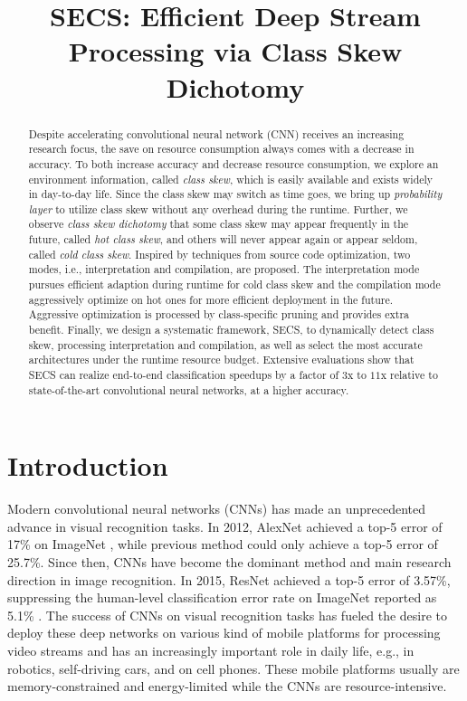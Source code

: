 \documentclass[pageno]{jpaper}
\begin{document}
\title{SECS: Efficient Deep Stream Processing via Class Skew Dichotomy}
\author{}
\date{}
\maketitle

\thispagestyle{empty}

\begin{abstract}
Despite accelerating convolutional neural network (CNN) receives an increasing research focus, the save on resource consumption always comes with a decrease in accuracy. To both increase accuracy and decrease resource consumption, we explore an environment information, called \textit{class skew}, which is easily available and exists widely in day-to-day life. Since the class skew may switch as time goes, we bring up \textit{probability layer} to utilize class skew without any overhead during the runtime. Further, we observe \textit{class skew dichotomy} that some class skew may appear frequently in the future, called \textit{hot class skew}, and others will never appear again or appear seldom, called \textit{cold class skew}. Inspired by techniques from source code optimization, two modes, i.e., interpretation and compilation, are proposed. The interpretation mode pursues efficient adaption during runtime for cold class skew and the compilation mode aggressively optimize on hot ones for more efficient deployment in the future. Aggressive optimization is processed by class-specific pruning and provides extra benefit. Finally, we design a systematic framework, SECS, to dynamically detect class skew, processing interpretation and compilation, as well as select the most accurate architectures under the runtime resource budget. Extensive evaluations show that SECS can realize end-to-end classification speedups by a factor of $3$x to $11$x relative to state-of-the-art convolutional neural networks, at a higher accuracy.
\end{abstract}




\section{Introduction} \label{Introduction}

Modern convolutional neural networks (CNNs) has made an unprecedented advance in visual recognition tasks. In 2012, AlexNet \cite{krizhevsky2012imagenet} achieved a top-5 error of 17\% on ImageNet \cite{deng2009imagenet}, while previous method could only achieve a top-5 error of 25.7\%. Since then, CNNs have become the dominant method and main research direction in image recognition. In 2015, ResNet \cite{he2016deep} achieved a top-5 error of 3.57\%, suppressing the human-level classification error rate on ImageNet reported as 5.1\% \cite{russakovsky2015imagenet}. The success of CNNs on visual recognition tasks has fueled the desire to deploy these deep networks on various kind of mobile platforms for processing video streams and has an increasingly important role in daily life, e.g., in robotics, self-driving cars, and on cell phones. These mobile platforms usually are memory-constrained and energy-limited while the CNNs are resource-intensive.
\end{document}
